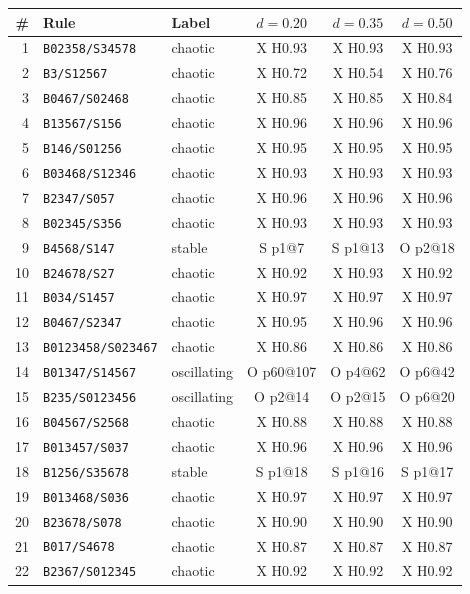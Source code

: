 {\small
\begin{longtable}{@{}rllccc@{}}
\toprule
\# & Rule & Label & $d=0.20$ & $d=0.35$ & $d=0.50$ \\
\midrule
\endhead
1 & \texttt{B02358/S34578} & chaotic & X H0.93 & X H0.93 & X H0.93 \\
2 & \texttt{B3/S12567} & chaotic & X H0.72 & X H0.54 & X H0.76 \\
3 & \texttt{B0467/S02468} & chaotic & X H0.85 & X H0.85 & X H0.84 \\
4 & \texttt{B13567/S156} & chaotic & X H0.96 & X H0.96 & X H0.96 \\
5 & \texttt{B146/S01256} & chaotic & X H0.95 & X H0.95 & X H0.95 \\
6 & \texttt{B03468/S12346} & chaotic & X H0.93 & X H0.93 & X H0.93 \\
7 & \texttt{B2347/S057} & chaotic & X H0.96 & X H0.96 & X H0.96 \\
8 & \texttt{B02345/S356} & chaotic & X H0.93 & X H0.93 & X H0.93 \\
9 & \texttt{B4568/S147} & stable & S p1@7 & S p1@13 & O p2@18 \\
10 & \texttt{B24678/S27} & chaotic & X H0.92 & X H0.93 & X H0.92 \\
11 & \texttt{B034/S1457} & chaotic & X H0.97 & X H0.97 & X H0.97 \\
12 & \texttt{B0467/S2347} & chaotic & X H0.95 & X H0.96 & X H0.96 \\
13 & \texttt{B0123458/S023467} & chaotic & X H0.86 & X H0.86 & X H0.86 \\
14 & \texttt{B01347/S14567} & oscillating & O p60@107 & O p4@62 & O p6@42 \\
15 & \texttt{B235/S0123456} & oscillating & O p2@14 & O p2@15 & O p6@20 \\
16 & \texttt{B04567/S2568} & chaotic & X H0.88 & X H0.88 & X H0.88 \\
17 & \texttt{B013457/S037} & chaotic & X H0.96 & X H0.96 & X H0.96 \\
18 & \texttt{B1256/S35678} & stable & S p1@18 & S p1@16 & S p1@17 \\
19 & \texttt{B013468/S036} & chaotic & X H0.97 & X H0.97 & X H0.97 \\
20 & \texttt{B23678/S078} & chaotic & X H0.90 & X H0.90 & X H0.90 \\
21 & \texttt{B017/S4678} & chaotic & X H0.87 & X H0.87 & X H0.87 \\
22 & \texttt{B2367/S012345} & chaotic & X H0.92 & X H0.92 & X H0.92 \\

\end{longtable}}
